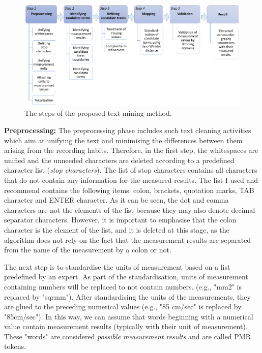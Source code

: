 \begin{figure}[h]
	\centering
        \captionsetup{justification=centering}
	\includegraphics[width=\textwidth]{assets/figures/text_mining/extraction/workflow.eps}
	\caption{The steps of the proposed text mining method.}
	\label{fig:extraction_workflow} 
\end{figure}

\textbf{Preprocessing:} The preprocessing phase includes such text cleaning activities which aim at unifying the text and minimising the differences between them arising from the recording habits. Therefore, in the first step, the whitespaces are unified and the unneeded characters are deleted according to a predefined character list (\textit{stop characters}). The list of stop characters contains all characters that do not contain any information for the measured results. The list I used and recommend contains the following items: colon, brackets, quotation marks, TAB character and ENTER character. As it can be seen, the dot and comma characters are not the elements of the list because they may also denote decimal separator characters. However, it is important to emphasise that the colon character is the element of the list, and it is deleted at this stage, as the algorithm does not rely on the fact that the measurement results are separated from the name of the measurement by a colon or not. 

The next step is to standardise the units of measurement based on a list predefined by an expert. As part of the standardisation, units of measurement containing numbers will be replaced to not contain numbers. (e.g., "mm2" is replaced by "sqrmm"). After standardising the units of the measurements, they are glued to the preceding numerical values (e.g., "85 cm/sec" is replaced by "85cm/sec"). In this way, we can assume that words beginning with a numerical value contain measurement results (typically with their unit of measurement). These "words" are considered \textit{possible measurement results} and are called PMR tokens.

